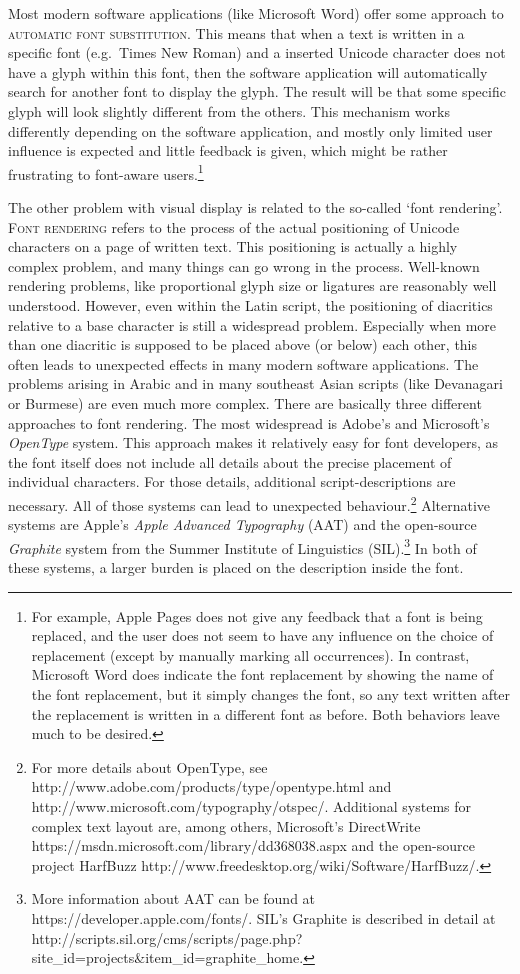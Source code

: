 Most modern software applications (like Microsoft Word) offer some approach to \textsc{automatic font substitution}. This means that when a text is written in a specific font (e.g.~Times New Roman) and a inserted Unicode character does not have a glyph within this font, then the software application will automatically search for another font to display the glyph. The result will be that some specific glyph will look slightly different from the others. This mechanism works differently depending on the software application, and mostly only limited user influence is expected and little feedback is given, which might be rather frustrating to font-aware users.\footnote{For example, Apple Pages does not give any feedback that a font is being replaced, and the user does not seem to have any influence on the choice of replacement (except by manually marking all occurrences). In contrast, Microsoft Word does indicate the font replacement by showing the name of the font replacement, but it simply changes the font, so any text written after the replacement is written in a different font as before. Both behaviors leave much to be desired.}

The other problem with visual display is related to the so-called `font rendering'. \textsc{Font rendering }refers to the process of the actual positioning of Unicode characters on a page of written text. This positioning is actually a highly complex problem, and many things can go wrong in the process. Well-known rendering problems, like proportional glyph size or ligatures are reasonably well understood. However, even within the Latin script, the positioning of diacritics relative to a base character is still a widespread problem. Especially when more than one diacritic is supposed to be placed above (or below) each other, this often leads to unexpected effects in many modern software applications. The problems arising in Arabic and in many southeast Asian scripts (like Devanagari or Burmese) are even much more complex. There are basically three different approaches to font rendering. The most widespread is Adobe's and Microsoft's \emph{OpenType }system. This approach makes it relatively easy for font developers, as the font itself does not include all details about the precise placement of individual characters. For those details, additional script-descriptions are necessary. All of those systems can lead to unexpected behaviour.\footnote{For more details about OpenType, see http://www.adobe.com/products/type/opentype.html and http://www.microsoft.com/typography/otspec/. Additional systems for complex text layout are, among others, Microsoft's DirectWrite https://msdn.microsoft.com/library/dd368038.aspx and the open-source project HarfBuzz http://www.freedesktop.org/wiki/Software/HarfBuzz/.} Alternative systems are Apple's \emph{Apple Advanced Typography} (AAT) and the open-source \emph{Graphite} system from the Summer Institute of Linguistics (SIL).\footnote{More information about AAT can be found at https://developer.apple.com/fonts/. SIL's Graphite is described in detail at http://scripts.sil.org/cms/scripts/page.php?site\_id=projects\&item\_id=graphite\_home.} In both of these systems, a larger burden is placed on the description inside the font.

